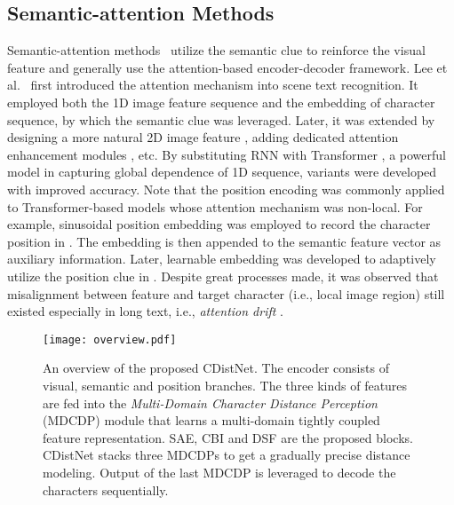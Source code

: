\subsection{Semantic-attention Methods}
Semantic-attention methods~\citep{chen2019adaptive,cluo2019moran,shi2018aster,sheng2019nrtr} utilize the semantic clue to reinforce the visual feature and generally use the attention-based encoder-decoder framework. Lee et al.~\citep{lee2016attention_origin} first introduced the attention mechanism into scene text recognition. It employed both the 1D image feature sequence and the embedding of character sequence, by which the semantic clue was leveraged. Later, it was extended by designing a more natural 2D image feature \citep{li2019sar}, adding dedicated attention enhancement modules \citep{cheng2017focusing_attention}, etc. By substituting RNN with Transformer \citep{vaswani2017transformer}, a powerful model in capturing global dependence of 1D sequence, variants \citep{sheng2019nrtr,wang2019simple_transformer,2dattentionlyu20192d} were developed with improved accuracy. Note that the position encoding was commonly applied to Transformer-based models whose attention mechanism was non-local. For example, sinusoidal position embedding was employed to record the character position in \citep{sheng2019nrtr}. The embedding is then appended to the semantic feature vector as auxiliary information. Later, learnable embedding was developed to adaptively utilize the position clue in \citep{devlin2019bert,lan2019albert}. Despite great processes made, it was observed that misalignment between feature and target character (i.e., local image region) still existed especially in long text, i.e., \emph{attention drift} \citep{cheng2017focusing_attention,liao2019two_dim_per,yue2020robustscanner,wang2019scene}.

\begin{figure*}[t]
\centering
\texttt{[image: overview.pdf]} 
\caption{An overview of the proposed CDistNet. The encoder consists of visual, semantic and position branches. The three kinds of features are fed into the \emph{Multi-Domain Character Distance Perception} (MDCDP) module that learns a multi-domain tightly coupled feature representation. SAE, CBI and DSF are the proposed blocks. CDistNet stacks three MDCDPs to get a gradually precise distance modeling. Output of the last MDCDP is leveraged to decode the characters sequentially.}

\label{fig2}
\end{figure*}

